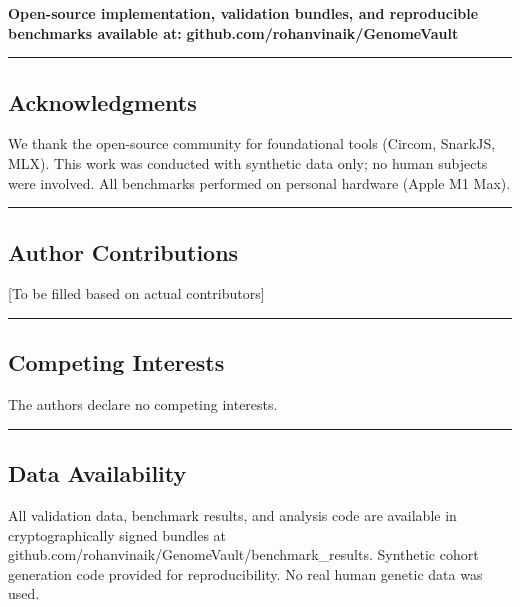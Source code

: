 \documentclass[
  11pt,
]{article}
\begin{document}
\textbf{Open-source implementation, validation bundles, and reproducible
benchmarks available at:} \textbf{github.com/rohanvinaik/GenomeVault}

\begin{center}\rule{0.5\linewidth}{0.5pt}\end{center}

\subsection{Acknowledgments}\label{acknowledgments}

We thank the open-source community for foundational tools (Circom,
SnarkJS, MLX). This work was conducted with synthetic data only; no
human subjects were involved. All benchmarks performed on personal
hardware (Apple M1 Max).

\begin{center}\rule{0.5\linewidth}{0.5pt}\end{center}

\subsection{Author Contributions}\label{author-contributions}

{[}To be filled based on actual contributors{]}

\begin{center}\rule{0.5\linewidth}{0.5pt}\end{center}

\subsection{Competing Interests}\label{competing-interests}

The authors declare no competing interests.

\begin{center}\rule{0.5\linewidth}{0.5pt}\end{center}

\subsection{Data Availability}\label{data-availability}

All validation data, benchmark results, and analysis code are available
in cryptographically signed bundles at
github.com/rohanvinaik/GenomeVault/benchmark\_results. Synthetic cohort
generation code provided for reproducibility. No real human genetic data
was used.
\end{document}
